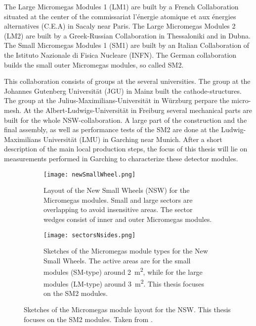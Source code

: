 \documentclass[
twoside,            %
BCOR1.4cm,          %
10pt,               %
headings=normal,    %
headsepline,        %
clearplainpage,		%
final,              %
div=14,
open=right,
bibliography=toc
]{scrreprt}
\begin{document}
The Large Micromegas Modules 1 (LM1) are built by a French Collaboration situated at the center of the commissariat l'\'{e}nergie atomique et aux \'{e}nergies alternatives (C.E.A) in Sacaly near Paris.
The Large Micromegas Modules 2 (LM2) are built by a Greek-Russian Collaboration in Thessaloniki and in Dubna.
The Small Micromegas Modules 1 (SM1) are built by an Italian Collaboration of the Istituto Nazionale di Fisica Nucleare (INFN).
The German collaboration builds the small outer Micromegas modules, so called SM2.

This collaboration consists of groups at the several universities.
The group at the Johannes Gutenberg Universit\"at (JGU) in Mainz built the cathode-structures.
The group at the Julius-Maximilians-Universit\"at in W\"urzburg perpare the micro-mesh.
At the Albert-Ludwigs-Universit\"at in Freiburg several mechanical parts are built for the whole NSW-collaboration.
A large part of the construction and the final assembly, as well as performance tests of the SM2 are done at the Ludwig-Maximilians Universit\"at (LMU) in Garching near Munich.
After a short description of the main local production steps, the focus of this thesis will lie on measurements performed in Garching to characterize these detector modules.

\newpage

\begin{figure}[!h]
	\begin{subfigure}[b]{0.48\textwidth}
		\centering
		\texttt{[image: newSmallWheel.png]}
		\caption{
			Layout of the New Small Wheels (NSW) for the Micromegas modules.
			Small and large sectors are overlapping to avoid insensitive areas.
			The sector wedges consist of inner and outer Micromegas modules.
		}
		\label{NSWsketch} 
	\end{subfigure}
	\hfill
	\begin{subfigure}[b]{0.48\textwidth}
		\centering
		\texttt{[image: sectorsNsides.png]}
		\caption{
			Sketches of the Micromegas module types for the New Small Wheels. 
			The active areas are for the small modules (SM-type) around \SI{2}{\square m}, while for the large modules (LM-type) around \SI{3}{\square m}. 
			This thesis focuses on the SM2 modules.
		}
		\label{moduleTypes} 
	\end{subfigure}
	\vspace{-2mm}
	\caption{
		Sketches of the Micromegas module layout for the NSW.
		This thesis focuses on the SM2 modules.
		Taken from \cite{NSW_TDR}.
	}
	\label{NSWlayout}
\end{figure}
\end{document}
